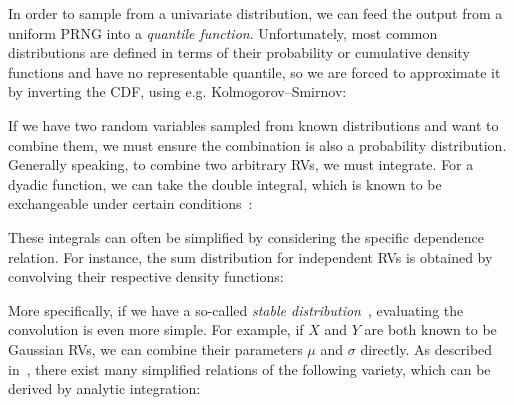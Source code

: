 \documentclass[11pt]{article}
\begin{document}
    \noindent In order to sample from a univariate distribution, we can feed the output from a uniform PRNG into a \textit{quantile function}. Unfortunately, most common distributions are defined in terms of their probability or cumulative density functions and have no representable quantile, so we are forced to approximate it by inverting the CDF, using e.g. Kolmogorov–Smirnov:

\begin{prooftree}
\end{prooftree}

\noindent If we have two random variables sampled from known distributions and want to combine them, we must ensure the combination is also a probability distribution. Generally speaking, to combine two arbitrary RVs, we must integrate. For a dyadic function, we can take the double integral, which is known to be exchangeable under certain conditions~\cite{fubini1907sugli}:

\begin{prooftree}
\end{prooftree}

\noindent These integrals can often be simplified by considering the specific dependence relation. For instance, the sum distribution for independent RVs is obtained by convolving their respective density functions:

\begin{prooftree}
\end{prooftree}

\noindent More specifically, if we have a so-called \textit{stable distribution}~\cite{levy1925calcul}, evaluating the convolution is even more simple. For example, if $X$ and $Y$ are both known to be Gaussian RVs, we can combine their parameters $\mu$ and $\sigma$ directly. As described in~\cite{willard2020minikanren}, there exist many simplified relations of the following variety, which can be derived by analytic integration:
\end{document}
